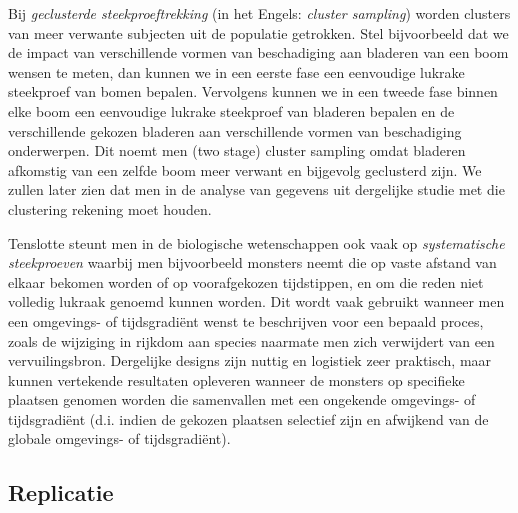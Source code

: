 \documentclass[
  12pt,dutch]{book}
\theoremstyle{definition}
\theoremstyle{definition}
\theoremstyle{definition}
\theoremstyle{definition}
\theoremstyle{remark}
\begin{document}
Bij \emph{geclusterde steekproeftrekking} (in het Engels: \emph{cluster sampling}) worden clusters van meer verwante subjecten uit de populatie getrokken. Stel bijvoorbeeld dat we de impact van verschillende vormen van beschadiging aan bladeren van een boom wensen te meten, dan kunnen we in een eerste fase een eenvoudige lukrake steekproef van bomen bepalen. Vervolgens kunnen we in een tweede fase binnen elke boom een eenvoudige lukrake steekproef van bladeren bepalen en de verschillende gekozen bladeren aan verschillende vormen van beschadiging onderwerpen. Dit noemt men (two stage) cluster sampling omdat bladeren afkomstig van een zelfde boom meer verwant en bijgevolg geclusterd zijn. We zullen later zien dat men in de analyse van gegevens uit dergelijke studie met die clustering rekening moet houden.

Tenslotte steunt men in de biologische wetenschappen ook vaak op \emph{systematische steekproeven} waarbij men bijvoorbeeld monsters neemt die op vaste afstand van elkaar bekomen worden of op voorafgekozen tijdstippen, en om die reden niet volledig lukraak genoemd kunnen worden. Dit wordt vaak gebruikt wanneer men een omgevings- of tijdsgradiënt wenst te beschrijven voor een bepaald proces, zoals de wijziging in rijkdom aan species naarmate men zich verwijdert van een vervuilingsbron. Dergelijke designs zijn nuttig en logistiek zeer praktisch, maar kunnen vertekende resultaten opleveren wanneer de monsters op specifieke plaatsen genomen worden die samenvallen met een ongekende omgevings- of tijdsgradiënt (d.i. indien de gekozen plaatsen selectief zijn en afwijkend van de globale omgevings- of tijdsgradiënt).

\subsection{Replicatie}\label{replicatie}
\end{document}
